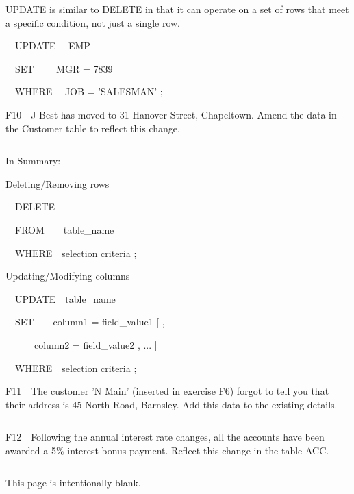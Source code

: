 UPDATE is similar to DELETE in that it can operate on a set of rows that meet a specific condition, not just a single row.

\ \ UPDATE \ \ EMP

\ \ SET \ \ \ \ MGR = 7839

\ \ WHERE \ \ JOB = 'SALESMAN' ;

F10\ \ J Best has moved to 31 Hanover Street, Chapeltown.  Amend the data in the Customer table to reflect this change.

\begin{flushleft}
\tablefirsthead{}
\tablehead{}
\tabletail{}
\tablelasttail{}
\begin{supertabular}{|m{14.663cm}|}
\hline
\\\hline
\end{supertabular}
\end{flushleft}
In Summary:-

Deleting/Removing rows\ \ 

\ \ DELETE

\ \ FROM\ \ \ \ table\_name

\ \ WHERE\ \ selection criteria ;

Updating/Modifying columns\ \ 

\ \ UPDATE\ \ table\_name

\ \ SET\ \ \ \ column1 = field\_value1 [ ,

\ \ \ \ \ \ column2 = field\_value2 ,  ... ]

\ \ WHERE\ \ selection criteria ;

F11\ \ The customer 'N Main' (inserted in exercise F6) forgot to tell you that their address is 45 North Road, Barnsley.  Add this data to the existing details.  

\begin{flushleft}
\tablefirsthead{}
\tablehead{}
\tabletail{}
\tablelasttail{}
\begin{supertabular}{|m{14.663cm}|}
\hline
\\\hline
\end{supertabular}
\end{flushleft}
F12\ \ Following the annual interest rate changes, all the accounts have been awarded a 5\% interest bonus payment.  Reflect this change in the table ACC.

\begin{flushleft}
\tablefirsthead{}
\tablehead{}
\tabletail{}
\tablelasttail{}
\begin{supertabular}{|m{14.663cm}|}
\hline
\\\hline
\end{supertabular}
\end{flushleft}
This page is intentionally blank.